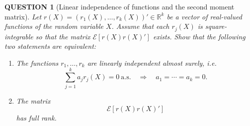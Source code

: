 \documentclass[12pt]{article}
\renewcommand{\(}{\left(}%
\renewcommand{\)}{\right)}%
\renewcommand{\[}{\left[}%
\renewcommand{\]}{\right]}%
\newcommand{\e}{\mathscr{E}}
\newtheorem{question}{QUESTION}[section]}
\begin{document}
 \begin{question}[Linear independence of functions and the second moment matrix]
Let $r(X)=(r_1(X),\dots,r_k(X))' \in \mathbb{R}^k$
be a vector of real-valued functions of the random variable $X$. Assume that each
$r_j(X)$ is square-integrable so that the matrix $\e[r(X)r(X)']$
exists.
Show that the following two statements are equivalent:

\begin{enumerate}
\item The functions $r_1,\dots,r_k$ are linearly independent almost surely, i.e.
\begin{equation*}
\sum_{j=1}^k a_j r_j(X)=0 \ \text{a.s.} \quad \Rightarrow \quad a_1=\cdots=a_k=0.
\end{equation*}

\item The matrix
\begin{equation*}
\e[r(X)r(X)']
\end{equation*}
has full rank.
\end{enumerate}
\end{question}
\end{document}

